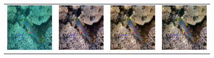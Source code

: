 \documentclass[letterpaper, 10pt, conference]{ieeeconf}
\begin{document}
\begin{figure}
\centering
\begin{tabular}{p{4.0cm} p{4.0cm} p{4.0cm} p{4.0cm}}
   
   \includegraphics[width=1.7in]{flickr_cmp} &
   \includegraphics[width=1.7in]{cgan_cmp} &
   \includegraphics[width=1.7in]{ugan_cmp} &
   \includegraphics[width=1.7in]{uganp_cmp} \\

\end{tabular}
\end{figure}
\end{document}
